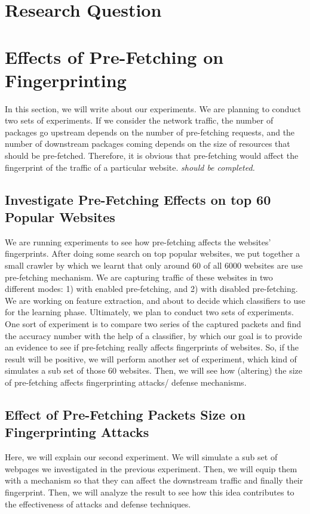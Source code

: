 
\section{Research Question}

\section{Effects of Pre-Fetching on Fingerprinting}
In this section, we will write  about our experiments. We are planning to conduct two sets of experiments. If we consider the network traffic, the number of packages go upstream depends on the number of pre-fetching requests, and the number of downstream packages coming depends on the size of resources that should be pre-fetched. Therefore, it is obvious that pre-fetching would affect the fingerprint of the traffic of a particular website.  \emph{should be completed.}

\subsection{Investigate Pre-Fetching Effects on top 60 Popular Websites}
We are running experiments to see how pre-fetching affects the websites' fingerprints.
After doing some search on top popular websites, we put together a small crawler by which we learnt that only around 60 of all 6000 websites are use pre-fetching mechanism. We are capturing traffic of these websites in two different modes: 1) with enabled pre-fetching, and 2) with disabled pre-fetching. We are working on feature extraction, and about to decide which classifiers to use for the learning phase.
Ultimately, we plan to conduct two sets of experiments. One sort of experiment is to compare two series of the captured packets and find the accuracy number with the help of a classifier, by which our goal is to provide an evidence to see if pre-fetching really affects fingerprints of websites. So, if the result will be positive, we will perform another set of experiment, which kind of simulates a sub set of those 60 websites. Then, we will see how (altering) the size of pre-fetching affects fingerprinting attacks/ defense mechanisms.


\subsection{Effect of Pre-Fetching Packets Size on Fingerprinting Attacks}
Here, we will explain our second experiment. We will simulate a sub set of webpages we investigated in the previous experiment. Then, we will equip them with a mechanism so that they can affect the downstream traffic and finally their fingerprint. Then, we will analyze the result to see how this idea contributes to the effectiveness of attacks and defense techniques.


